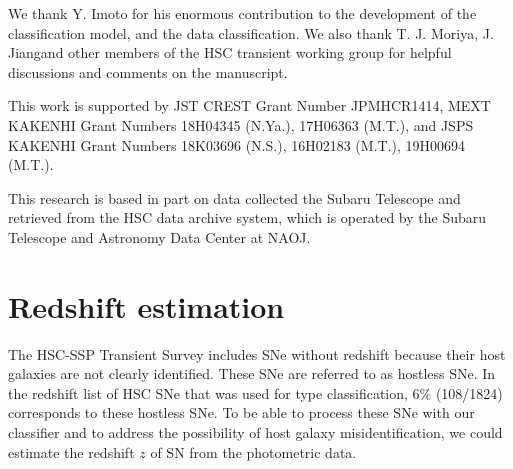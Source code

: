 \documentclass[proof]{pasj01}
\providecommand{\DIFadd}[1]{{\protect\color{blue} \sf #1}} %
\providecommand{\DIFdel}[1]{{\protect\color{red} \scriptsize #1}} %
\providecommand{\DIFaddbegin}{\protect\color{blue}} %
\providecommand{\DIFaddend}{\protect\color{black}} %
\providecommand{\DIFdelbegin}{\protect\color{red}} %
\providecommand{\DIFdelend}{\protect\color{black}} %
\newcommand{\DIFscaledelfig}{0.5}
\newlength{\DIFdelgraphicswidth} %
\newlength{\DIFdelgraphicsheight} %
\newcommand{\DIFaddincludegraphics}[2][]{{\color{blue}\fbox{\DIFOincludegraphics[#1]{#2}}}} %
\newcommand{\DIFdelincludegraphics}[2][]{%
\sbox{\DIFdelgraphicsbox}{\DIFOincludegraphics[#1]{#2}}%
\settoboxwidth{\DIFdelgraphicswidth}{\DIFdelgraphicsbox} %
\settoboxtotalheight{\DIFdelgraphicsheight}{\DIFdelgraphicsbox} %
\scalebox{\DIFscaledelfig}{%
\parbox[b]{\DIFdelgraphicswidth}{\usebox{\DIFdelgraphicsbox}\\[-\baselineskip] \rule{\DIFdelgraphicswidth}{0em}}\llap{\resizebox{\DIFdelgraphicswidth}{\DIFdelgraphicsheight}{%
\setlength{\unitlength}{\DIFdelgraphicswidth}%
\begin{picture}(1,1)%
\thicklines\linethickness{2pt} %
{\color[rgb]{1,0,0}\put(0,0){\framebox(1,1){}}}%
{\color[rgb]{1,0,0}\put(0,0){\line( 1,1){1}}}%
{\color[rgb]{1,0,0}\put(0,1){\line(1,-1){1}}}%
\end{picture}%
}\hspace*{3pt}}} %
} %
\DeclareRobustCommand{\DIFaddbegin}{\DIFOaddbegin \let\includegraphics\DIFaddincludegraphics} %
\DeclareRobustCommand{\DIFaddend}{\DIFOaddend \let\includegraphics\DIFOincludegraphics} %
\DeclareRobustCommand{\DIFdelbegin}{\DIFOdelbegin \let\includegraphics\DIFdelincludegraphics} %
\DeclareRobustCommand{\DIFdelend}{\DIFOaddend \let\includegraphics\DIFOincludegraphics} %
\begin{document}
\begin{ack}
We thank Y. Imoto for his enormous contribution to the development of the classification model, and the data classification.
We also thank T. J. Moriya, J. Jiang\DIFaddbegin \DIFadd{, }\DIFaddend and other members of the HSC transient working group for helpful discussions and comments on the manuscript.

This work is supported by JST CREST Grant Number JPMHCR1414, MEXT KAKENHI Grant Numbers 18H04345 (N.Ya.), 17H06363 (M.T.), and JSPS KAKENHI Grant Numbers 18K03696 (N.S.), 16H02183 (M.T.), 19H00694 (M.T.).

This research is based in part on data collected \DIFdelbegin \DIFdel{at }\DIFdelend \DIFaddbegin \DIFadd{with }\DIFaddend the Subaru Telescope and retrieved from the HSC data archive system, which is operated by the Subaru Telescope and Astronomy Data Center at NAOJ.
\end{ack}
%
%
\appendix 
\section*{Redshift estimation}
\label{sec:est_redshift}
The HSC-SSP Transient Survey includes SNe without redshift because their host galaxies are not clearly identified. These SNe are referred to as hostless SNe.
In the redshift list of HSC SNe that was used for type classification, 6\% (108/1824) corresponds to these hostless SNe.
To be able to process these SNe with our classifier and to address the possibility of host galaxy misidentification,
we could estimate the redshift $z$ of \DIFdelbegin \DIFdel{a }\DIFdelend \DIFaddbegin \DIFadd{an }\DIFaddend SN from the photometric data.
\end{document}
